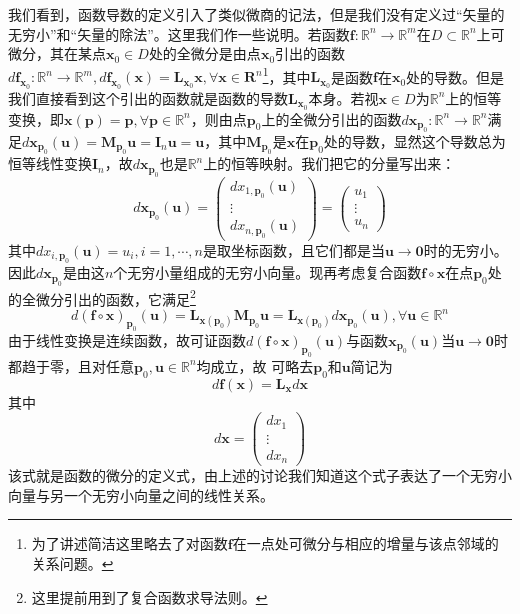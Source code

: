\documentclass[main.tex]{subfiles}
\begin{document}
我们看到，函数导数的定义引入了类似微商的记法，但是我们没有定义过“矢量的无穷小”和“矢量的除法”。这里我们作一些说明。若函数$\mathbf{f}:\mathbb{R}^n\rightarrow\mathbb{R}^m$在$D\subset\mathbb{R}^n$上可微分，其在某点$\mathbf{x}_0\in D$处的全微分是由点$\mathbf{x}_0$引出的函数$d\mathbf{f}_{\mathbf{x}_0}:\mathbb{R}^n\rightarrow\mathbb{R}^m,d\mathbf{f}_{\mathbf{x}_0}\left(\mathbf{x}\right)=\mathbf{L}_{\mathbf{x}_0}\mathbf{x},\forall \mathbf{x}\in\mathbf{R}^n$\footnote{为了讲述简洁这里略去了对函数$\mathbf{f}$在一点处可微分与相应的增量与该点邻域的关系问题。}，其中$\mathbf{L}_{\mathbf{x}_0}$是函数$\mathbf{f}$在$\mathbf{x}_0$处的导数。但是我们直接看到这个引出的函数就是函数的导数$\mathbf{L}_{\mathbf{x}_0}$本身。若视$\mathbf{x}\in D$为$\mathbb{R}^n$上的恒等变换，即$\mathbf{x}\left(\mathbf{p}\right)=\mathbf{p},\forall\mathbf{p}\in\mathbb{R}^n$，则由点$\mathbf{p}_0$上的全微分引出的函数$d\mathbf{x}_{\mathbf{p}_0}:\mathbb{R}^n\rightarrow\mathbb{R}^n$满足$d\mathbf{x}_{\mathbf{p}_0}\left(\mathbf{u}\right)=\mathbf{M}_{\mathbf{p}_0}\mathbf{u}=\mathbf{I}_n\mathbf{u}=\mathbf{u}$，其中$\mathbf{M}_{\mathbf{p}_0}$是$\mathbf{x}$在$\mathbf{p}_0$处的导数，显然这个导数总为恒等线性变换$\mathbf{I}_n$，故$d\mathbf{x}_{\mathbf{p}_0}$也是$\mathbb{R}^n$上的恒等映射。我们把它的分量写出来：
\[
    d\mathbf{x}_{\mathbf{p}_0}\left(\mathbf{u}\right)=\left(\begin{array}{c}
            dx_{1,\mathbf{p}_0}\left(\mathbf{u}\right) \\
            \vdots                                     \\
            dx_{n,\mathbf{p}_0}\left(\mathbf{u}\right)\end{array}\right)=\left(\begin{array}{c}
            u_1 \\\vdots\\u_n\end{array}\right)
\]
其中$dx_{i,\mathbf{p}_0}\left(\mathbf{u}\right)=u_i,i=1,\cdots,n$是取坐标函数，且它们都是当$\mathbf{u}\to\mathbf{0}$时的无穷小。因此$d\mathbf{x}_{\mathbf{p}_0}$是由这$n$个无穷小量组成的无穷小向量。现再考虑复合函数$\mathbf{f}\circ\mathbf{x}$在点$\mathbf{p}_0$处的全微分引出的函数，它满足\footnote{这里提前用到了复合函数求导法则。}
\[
    d\left(\mathbf{f}\circ \mathbf{x}\right)_{\mathbf{p}_0}\left(\mathbf{u}\right)=\mathbf{L}_{\mathbf{x}\left(\mathbf{p}_0\right)}\mathbf{M}_{\mathbf{p}_0}\mathbf{u}=\mathbf{L}_{\mathbf{x}\left(\mathbf{p}_0\right)}d\mathbf{x}_{\mathbf{p}_0}\left(\mathbf{u}\right),\forall\mathbf{u}\in\mathbb{R}^n\]
由于线性变换是连续函数，故可证函数$d\left(\mathbf{f}\circ \mathbf{x}\right)_{\mathbf{p}_0}\left(\mathbf{u}\right)$与函数$\mathbf{x}_{\mathbf{p}_0}\left(\mathbf{u}\right)$当$\mathbf{u}\to\mathbf{0}$时都趋于零，且对任意$\mathbf{p}_0,\mathbf{u}\in\mathbb{R}^n$均成立，故
可略去$\mathbf{p}_0$和$\mathbf{u}$简记为
\[d\mathbf{f}\left(\mathbf{x}\right)=\mathbf{L}_\mathbf{x}d\mathbf{x}\]
其中
\[d\mathbf{x}=\left(\begin{array}{c}dx_1\\\vdots\\dx_n\end{array}\right)\]
该式就是函数的微分的定义式，由上述的讨论我们知道这个式子表达了一个无穷小向量与另一个无穷小向量之间的线性关系。
\end{document}
